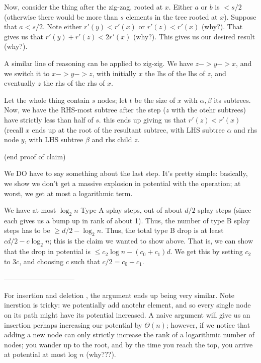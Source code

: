 \documentclass{article}
\begin{document}
Now, consider the thing after the zig-zag, rooted at $x$.
Either $a$ or $b$ is $< s/2$ (otherwise there would be more than $s$
elements in the tree rooted at $x$).
Suppose that $a < s / 2$.
Note either $r'(y) < r'(x)$ or $r'(z) < r'(x)$ (why?).
That gives us that $r'(y) + r'(z) < 2r'(x)$ (why?).
This gives us our desired result (why?).

A similar line of reasoning can be applied to zig-zig.
We have $z->y->x$, and we switch it to $x->y->z$, with initially
$x$ the lhs of the lhs of $z$, and eventually $z$ the rhs of the rhs of $x$.

Let the whole thing contain $s$ nodes; let $t$ be the size of $x$ with $\alpha,\beta$ its subtrees.
Now, we have the RHS-most subtree after the step ($z$ with the otehr subtrees)
have strictly less than half of $s$.
this ends up giving us that $r'(z) < r'(x)$ (recall $x$ ends up at
the root of the resultant subtree, with LHS subtree $\alpha$ and
rhs node $y$, with LHS subtree $\beta$ and rhs child $z$.


(end proof of claim)

We DO have to say something about the last step.
It's pretty simple: basically, we show we don't get a massive explosion in
potential with the operation; at worst, we get at most a logarithmic term.


We have at most $\log_2 n$ Type A splay steps, out of about $d/2$ splay
steps (since each gives us a bump up in rank of about 1).
Thus, the number of type B splay steps has to be $\geq d/2 - \log_2 n$.
Thus, the total type B drop is at least $cd/2 - c\log_2 n$; this is the claim
we wanted to show above. That is, we can show that
the drop in potential is $\leq c_2 \log n - (c_0 + c_1) d$.
We get this by setting $c_2$ to $3c$, and choosing $c$ such that
$c/2 = c_0 + c_1$.


------------------------------

For insertion and deletion , the argument ends up being very similar.
Note inerstion is tricky: we potentially add anotehr element, and so
every single node on its path might have its potential increased.
A naive argument will give us an insertion perhaps increasing our potential
by $\Theta(n)$; however, if we notice that adding a new node can only
strictly increase the rank of a logarithmic number of nodes;
you wander up to the root, and by the time you reach the top, you
arrive at potential at most log $n$ (why???).
\end{document}
